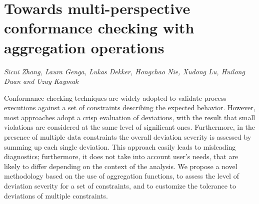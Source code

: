 \documentclass[../booklet.tex]{subfiles}
\begin{document}
\section[Towards multi-perspective conformance checking with aggregation operations. {\it Sicui Zhang, Laura Genga, Lukas Dekker, Hongchao Nie, Xudong Lu, Huilong Duan and Uzay Kaymak}]{Towards multi-perspective conformance checking with aggregation operations}
      

\begin{center}
  {\it Sicui Zhang, Laura Genga, Lukas Dekker, Hongchao Nie, Xudong Lu, Huilong Duan and Uzay Kaymak}
\end{center}

\vskip 0.8cm


 Conformance checking techniques are widely adopted to validate process executions against a set of constraints describing the expected behavior. However, most approaches adopt a crisp evaluation of
 deviations, with the result that small violations are considered at the same level of significant ones. %
 Furthermore, in the presence of multiple data constraints the overall deviation severity is assessed by summing up each single deviation. This approach easily leads to misleading diagnostics; furthermore, it does not take into account user's needs, that are likely to differ depending on the context of the analysis.
We propose a novel methodology based on the use of aggregation functions, to assess the level of deviation severity for a set of constraints, and to customize the tolerance to deviations of multiple constraints.
\end{document}
